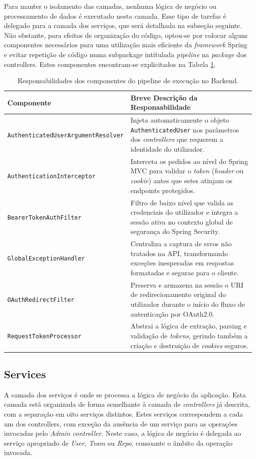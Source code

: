 Para manter o isolamento das camadas, nenhuma lógica de negócio ou processamento de dados é executado nesta camada. Esse tipo de tarefas é delegado para a camada dos serviços, que será detalhada na subseção seguinte. Não obstante, para efeitos de organização do código, optou-se por colocar alguns componentes necessários para uma utilização mais eficiente da \textit{framework} Spring e evitar repetição de código numa subpackage intitulada \textit{pipeline} na \textit{package} dos controllers. Estes componentes encontram-se explicitados na Tabela \ref{tab:pipeline_components}. \\

\begin{table}[htbp] 
	\centering
	\caption{Responsabilidades dos componentes do pipeline de execução no Backend.}
	\label{tab:pipeline_components}
	\begin{tabular}{|l|p{10cm}|}
		\hline
		\textbf{Componente} & \textbf{Breve Descrição da Responsabilidade} \\ \hline
		\texttt{AuthenticatedUserArgumentResolver} & Injeta automaticamente o objeto \texttt{AuthenticatedUser} nos parâmetros dos \textit{controllers} que requerem a identidade do utilizador. \\ \hline
		\texttt{AuthenticationInterceptor} & Interceta os pedidos ao nível do Spring MVC para validar o \textit{token} (\textit{header} ou \textit{cookie}) antes que estes atinjam os endpoints protegidos. \\ \hline
		\texttt{BearerTokenAuthFilter} & Filtro de baixo nível que valida as credenciais do utilizador e integra a sessão ativa no contexto global de segurança do Spring Security. \\ \hline
		\texttt{GlobalExceptionHandler} & Centraliza a captura de erros não tratados na API, transformando exceções inesperadas em respostas formatadas e seguras para o cliente. \\ \hline
		\texttt{OAuthRedirectFilter} & Preserva e armazena na sessão o URI de redirecionamento original do utilizador durante o início do fluxo de autenticação por OAuth2.0. \\ \hline
		\texttt{RequestTokenProcessor} & Abstrai a lógica de extração, parsing e validação de \textit{tokens}, gerindo também a criação e destruição de \textit{cookies} seguros. \\ \hline
	\end{tabular}
\end{table}

\subsection{Services}
A camada dos serviços é onde se processa a lógica de negócio da aplicação. Esta camada está organizada de forma semelhante à camada de \textit{controllers} já descrita, com a separação em oito serviços distintos. Estes serviços correspondem a cada um dos controllers, com exceção da ausência de um serviço para as operações invocadas pelo \textit{Admin controller}. Neste caso, a lógica de negócio é delegada ao serviço apropriado de \textit{User}, \textit{Team} ou \textit{Repo}, consoante o âmbito da operação invocada. \\

